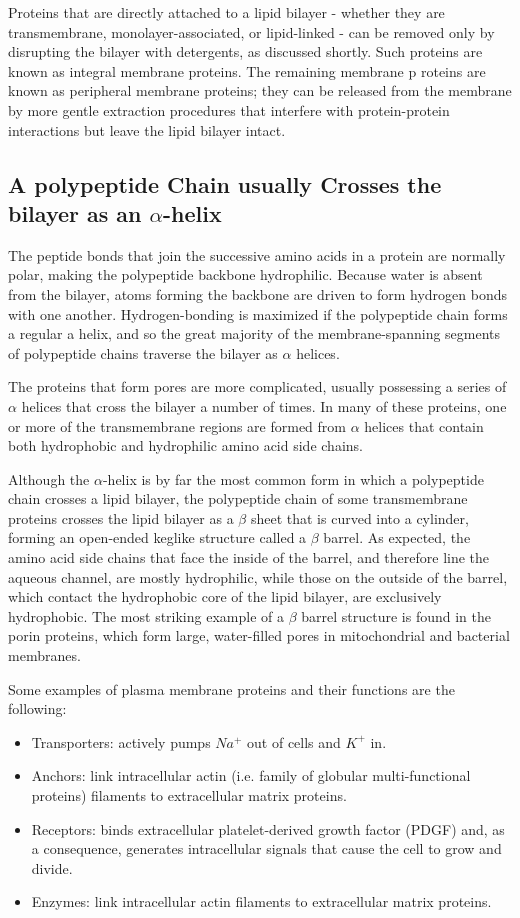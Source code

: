 Proteins that are directly attached to a lipid bilayer - whether they are
transmembrane, monolayer-associated, or lipid-linked - can be removed
only by disrupting the bilayer with detergents, as discussed shortly. Such
proteins are known as integral membrane proteins. The remaining membrane p
roteins are known as peripheral membrane proteins; they can
be released from the membrane by more gentle extraction procedures
that interfere with protein-protein interactions but leave the lipid bilayer
intact.

\subsection{A polypeptide Chain usually Crosses the bilayer as an $\alpha$-helix}

The peptide bonds that join the successive amino acids in a protein are normally polar, making
the polypeptide backbone hydrophilic. Because water is
absent from the bilayer, atoms forming the backbone are driven to form
hydrogen bonds with one another. Hydrogen-bonding is maximized if the
polypeptide chain forms a regular a helix, and so the great majority of the
membrane-spanning segments of polypeptide chains traverse the bilayer
as $\alpha$ helices.

The proteins that form pores are more complicated, usually possessing a 
series of $\alpha$ helices that cross the bilayer a number of times. In many of these proteins,
one or more of the transmembrane regions are formed from $\alpha$ helices
that contain both hydrophobic and hydrophilic amino acid side chains.

Although the $\alpha$-helix is by far the most common form in which a polypeptide
chain crosses a lipid bilayer, the polypeptide chain of some transmembrane 
proteins crosses the lipid bilayer as a $\beta$ sheet that is curved into a
cylinder, forming an open-ended keglike structure called a $\beta$ barrel. As
expected, the amino acid side chains that face the inside of the barrel, and
therefore line the aqueous channel, are mostly hydrophilic, while those
on the outside of the barrel, which contact the hydrophobic core of the
lipid bilayer, are exclusively hydrophobic. The most striking example of a
$\beta$ barrel structure is found in the porin proteins, which form large, water-filled 
pores in mitochondrial and bacterial membranes.

Some examples of plasma membrane proteins and their functions are the following:

\begin{itemize}
\item Transporters: actively pumps $Na^{+}$ out of cells and $K^{+}$ in.
\item Anchors: link intracellular actin (i.e. family of globular multi-functional proteins) filaments to extracellular matrix proteins.
\item Receptors: binds extracellular platelet-derived growth factor (PDGF) and, as a consequence, generates intracellular signals
that cause the cell to grow and divide.
\item Enzymes: link intracellular actin filaments to extracellular matrix proteins.
\end{itemize}

